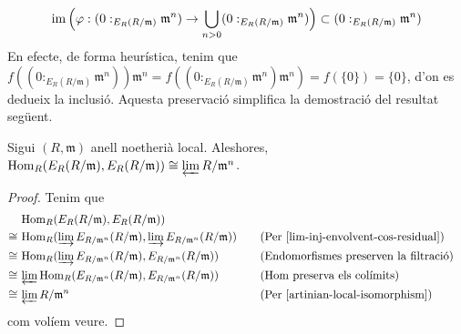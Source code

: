 \begin{equation*}
    \operatorname{im}\Big(\varphi:(0:_{E_{R}(R/\mathfrak{m})}\mathfrak{m}^{n})\rightarrow\bigcup_{n>0}(0:_{E_{R}(R/\mathfrak{m})}\mathfrak{m}^{n})\Big)
    \subset(0:_{E_{R}(R/\mathfrak{m})}\mathfrak{m}^{n})
\end{equation*}
En efecte, de forma heurística, tenim que $f((0:_{E_{R}(R/\mathfrak{m})}\mathfrak{m}^{n}))\mathfrak{m}^{n}=f((0:_{E_{R}(R/\mathfrak{m})}\mathfrak{m}^{n})\mathfrak{m}^{n})=f(\{0\})=\{0\}$, d'on es dedueix la inclusió. Aquesta preservació simplifica la demostració del resultat següent.
\begin{teorema}\label{m-adic-isomorphism}
    Sigui $(R,\mathfrak{m})$ anell noetherià local. Aleshores, $\operatorname{Hom}_{R}(E_{R}(R/\mathfrak{m}),E_{R}(R/\mathfrak{m}))\cong\varprojlim R/\mathfrak{m}^{n}$.
    \begin{proof}
        Tenim que
        \begin{align*}
            &\operatorname{Hom}_{R}(E_{R}(R/\mathfrak{m}),E_{R}(R/\mathfrak{m}))\\
            \cong\,
            &\operatorname{Hom}_{R}(\varinjlim E_{R/\mathfrak{m}^{n}}(R/\mathfrak{m}),\varinjlim E_{R/\mathfrak{m}^{n}}(R/\mathfrak{m}))
            &\quad&\textrm{(Per \ref{lim-inj-envolvent-cos-residual})}\\
            \cong\,
            &\operatorname{Hom}_{R}(\varinjlim E_{R/\mathfrak{m}^{n}}(R/\mathfrak{m}), E_{R/\mathfrak{m}^{n}}(R/\mathfrak{m}))
            &\quad&\textrm{(Endomorfismes preserven la filtració)}\\
            \cong\,
            &\varprojlim\operatorname{Hom}_{R}(E_{R/\mathfrak{m}^{n}}(R/\mathfrak{m}),E_{R/\mathfrak{m}^{n}}(R/\mathfrak{m}))
            &\quad&\textrm{(Hom preserva els colímits)}\\
            \cong\,
            &\varprojlim R/\mathfrak{m}^{n}
            &\quad&\textrm{(Per \ref{artinian-local-isomorphism})}
        \end{align*}
        com volíem veure.
    \end{proof}
\end{teorema}
